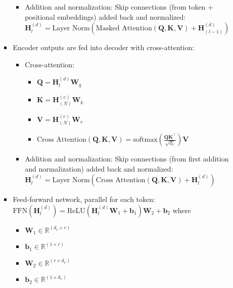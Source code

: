 \begin{itemize}
\begin{itemize}
\begin{itemize}
\begin{itemize}
\begin{itemize}
                \end{itemize}
                \item Addition and normalization: Skip connections (from token + positional embeddings) added back and normalized: $\boldsymbol{H}_l^{(d)} = \text{Layer Norm}(\text{Masked Attention}(\boldsymbol{Q}, \boldsymbol{K}, \boldsymbol{V}) + \boldsymbol{H}_{(l-1)}^{(d)})$
            \end{itemize}
            \item Encoder outputs are fed into decoder with cross-attention: 
            \begin{itemize}
                \item Cross-attention:
                \begin{itemize}
                    \item $\boldsymbol{Q} = \boldsymbol{H}_l^{(d)} \boldsymbol{W}_q$
                    \item $\boldsymbol{K} = \boldsymbol{H}_{(N)}^{(e)} \boldsymbol{W}_k$
                    \item $\boldsymbol{V} = \boldsymbol{H}_{(N)}^{(e)} \boldsymbol{W}_v$
                    \item $\text{Cross Attention}(\boldsymbol{Q}, \boldsymbol{K}, \boldsymbol{V}) = \text{softmax}\left(\frac{\boldsymbol{Q} \boldsymbol{K}^\top}{\sqrt{d_k}}\right) \boldsymbol{V}$
                \end{itemize}
                \item Addition and normalization: Skip connections (from first addition and normalization) added back and normalized: $\boldsymbol{H}_l^{(d)} = \text{Layer Norm}(\text{Cross Attention}(\boldsymbol{Q}, \boldsymbol{K}, \boldsymbol{V}) + \boldsymbol{H}_l^{(d)})$
            \end{itemize}
            \item Feed-forward network, parallel for each token: $\text{FFN}(\boldsymbol{H}_l^{(d)}) = \textrm{ReLU}(\boldsymbol{H}_l^{(d)} \boldsymbol{W}_1 + \boldsymbol{b}_1)\boldsymbol{W}_2 + \boldsymbol{b}_2$ where
            \begin{itemize}
                \item $\boldsymbol{W}_1 \in \mathbb{R}^{(d_v \times r)}$
                \item $\boldsymbol{b}_1 \in \mathbb{R}^{(1 \times r)}$
                \item $\boldsymbol{W}_2 \in \mathbb{R}^{(r \times d_v)}$
                \item $\boldsymbol{b}_2 \in \mathbb{R}^{(1 \times d_v)}$

\end{itemize}
\end{itemize}
\end{itemize}
\end{itemize}
